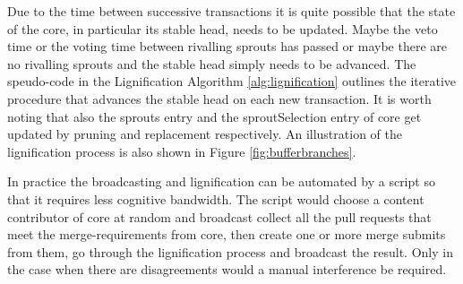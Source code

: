 Due to the time between successive transactions it is quite possible that the state of the core, in particular its stable head, needs to be updated. Maybe the veto time or the voting time between rivalling sprouts has passed or maybe there are no rivalling sprouts and the stable head simply needs to be advanced. The speudo-code in the Lignification Algorithm \ref{alg:lignification} outlines the iterative procedure that advances the stable head on each new transaction. It is worth noting that also the sprouts entry and the sproutSelection entry of core get updated by pruning and replacement respectively.
An illustration of the lignification process is also shown in Figure \ref{fig:bufferbranches}.

In practice the broadcasting and lignification can be automated by a script so that it requires less cognitive bandwidth. The script would choose a content contributor of core at random and broadcast collect all the pull requests that meet the merge-requirements from core, then create one or more merge submits from them, go through the lignification process and broadcast the result. Only in the case when there are disagreements would a manual interference be required.

